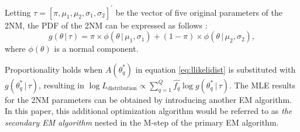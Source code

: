 Letting \(\tau = [\pi, \mu_1, \mu_2, \sigma_1, \sigma_2]^{'}\) be the vector
of five original parameters of the 2NM, the PDF of the 2NM can be expressed as follows \citep{Li:2021}:
\begin{equation}
g{(\theta \, | \, \tau)} = \pi \times \phi{(\theta \, | \, \mu_1, \sigma_1)} +
(1 - \pi) \times \phi{(\theta \, | \, \mu_2, \sigma_2)},
\label{eq:2nm}
\end{equation}
where \(\phi{(\theta)}\) is a normal component.

Proportionality holds when \(A{\left( \theta^{*}_{q} \right)}\) in equation
\eqref{eq:llikelidist} is substituted with \(g{(\theta^{*}_{q} \, | \, \tau)}\), resulting in
\(\log{L_{\text{distribution}}}\propto \sum_{q = 1}^{Q}{ \hat{f_{q}} \log{g{(\theta^{*}_{q} \, | \, \tau)}} }\).
The MLE results for the 2NM parameters can be obtained by introducing
another EM algorithm. In this paper, this additional optimization
algorithm would be referred to as \emph{the secondary EM algorithm} nested in
the M-step of the primary EM algorithm.


